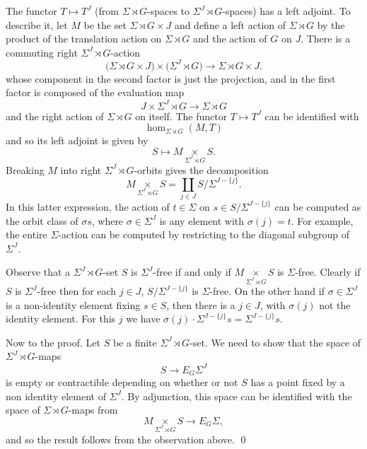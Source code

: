 \documentclass{amsart}
\theoremstyle{definition}
\theoremstyle{remark}
\newenvironment{pf}{\bigskip{\em Proof:\/}}{\qed\medskip}
\newcommand{\eggroup}[2]{E_{#1}#2}
\newcommand{\egsigma}[1]{\eggroup{#1}{\Sigma}}
\begin{document}
\begin{pf}
The functor $T\mapsto T^{J}$ (from $\Sigma\rtimes G$-spaces to
$\Sigma^{J}\rtimes G$-spaces) has a left adjoint.  To describe it,
let $M$ be the set $\Sigma\rtimes G\times J$ and define a left action
of $\Sigma\rtimes G$ by the product of the translation action on
$\Sigma\rtimes G$ and the action of $G$ on $J$.  There is a commuting
right $\Sigma^{J}\rtimes G$-action
\[
\big(\Sigma\rtimes G\times J\big)\times \big(\Sigma^{J}\rtimes G\big)
\to \Sigma\rtimes G\times J.
\]
whose component in the second factor is just the projection, and in
the first factor is composed of the evaluation map
\[
J\times \Sigma^{J}\rtimes G\to \Sigma\rtimes G
\]
and the right action of $\Sigma\rtimes G$ on itself.  The functor
$T\mapsto T^{J}$ can be identified with
\[
\hom_{\Sigma\rtimes G}(M,T)
\]
and so its left adjoint is given by 
\[
S \mapsto M\underset{\Sigma^{J}\rtimes G}{\times}S.
\]
Breaking $M$ into right $\Sigma^{J}\rtimes G$-orbits gives the
decomposition
\[
M\underset{\Sigma^{J}\rtimes G}{\times}S =\coprod_{j\in J} S/\Sigma^{J-\{j\}}.
\]
In this latter expression, the action of $t\in\Sigma$ on $s\in
S/\Sigma^{J-\{j\}}$ can be computed as the orbit class of $\sigma s$,
where $\sigma\in\Sigma^{J}$ is any element with $\sigma(j)=t$.   For
example, the entire $\Sigma$-action can be computed by restricting to
the diagonal subgroup of $\Sigma^{J}$.

Observe that a $\Sigma^{J}\rtimes G$-set $S$ is $\Sigma^{J}$-free if
and only if $M\underset{\Sigma^{J}\rtimes G}{\times}S$ is
$\Sigma$-free.  Clearly if $S$ is $\Sigma^{J}$-free then for each
$j\in J$, $S/\Sigma^{J-\{j \}}$ is $\Sigma$-free.  On the other hand
if $\sigma\in\Sigma^{J}$ is a non-identity element fixing $s\in S$,
then there is a $j\in J$, with $\sigma(j)$ not the identity element.
For this $j$ we have $\sigma(j)\cdot \Sigma^{J-\{j \}}s=\Sigma^{J-\{j
\}}s$.

Now to the proof.  Let $S$ be a finite $\Sigma^{J}\rtimes G$-set.  We
need to show that the space of $\Sigma^{J}\rtimes G$-maps
\[
S\to \egsigma{G}^{J}
\]
is empty or contractible depending on whether or not $S$ has a point
fixed by a non identity element of $\Sigma^{J}$.  By adjunction, this
space can be identified with the space of $\Sigma\rtimes G$-maps from
\[
M\underset{\Sigma^{J}\rtimes G}{\times} S \to \egsigma{G}, 
\]
and so the result follows from the observation above.  
\end{pf}
\end{document}
